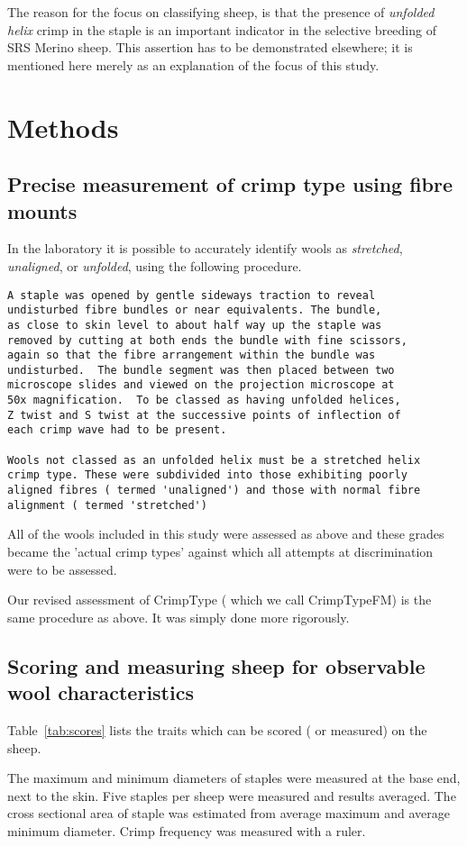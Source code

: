 \documentclass[titlepage]{article}  %
\begin{document}
The reason for the focus on classifying sheep, is that the presence of {\em unfolded helix} crimp in the staple is an important indicator in the selective breeding of SRS Merino sheep. This assertion has to be demonstrated elsewhere; it is mentioned here merely as an explanation of the focus of this study.


\section{Methods}
\subsection{Precise measurement of crimp type using fibre mounts}
In the laboratory it is possible to accurately identify wools as {\em stretched}, {\em unaligned}, or {\em unfolded}, using the following procedure.

\begin{verbatim}
A staple was opened by gentle sideways traction to reveal
undisturbed fibre bundles or near equivalents. The bundle,
as close to skin level to about half way up the staple was
removed by cutting at both ends the bundle with fine scissors,
again so that the fibre arrangement within the bundle was
undisturbed.  The bundle segment was then placed between two
microscope slides and viewed on the projection microscope at
50x magnification.  To be classed as having unfolded helices,
Z twist and S twist at the successive points of inflection of
each crimp wave had to be present. 

Wools not classed as an unfolded helix must be a stretched helix
crimp type. These were subdivided into those exhibiting poorly
aligned fibres ( termed 'unaligned') and those with normal fibre
alignment ( termed 'stretched')
\end{verbatim}

All of the wools included in this study were assessed as above and these grades became the 'actual crimp types' against which all attempts at discrimination were to be assessed.

Our revised assessment of CrimpType ( which we call CrimpTypeFM) is the same procedure as above. It was simply done more rigorously.

\subsection{Scoring and measuring sheep for observable wool characteristics}
Table~\ref{tab:scores} lists the traits which can be scored ( or measured) on the sheep. 

The maximum and minimum diameters of staples were measured at the base end, next to the skin. Five staples per sheep were measured and results averaged. The cross sectional area of staple was estimated from average maximum and average minimum diameter. Crimp frequency was measured with a ruler.
\end{document}
